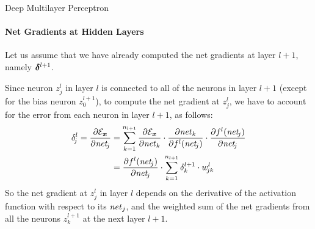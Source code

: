 \begin{frame}{Deep Multilayer Perceptron}
\framesubtitle{Net Gradients at Hidden Layers}
Let us assume that we have already computed the net gradients at layer
$l+1$, namely ${\bm \delta}^{l+1}$.

\medskip

Since neuron $z^l_{\!j}$ in layer $l$ is connected to all of the neurons in
layer $l+1$ (except for the bias neuron $z^{l+1}_0$), 
to compute the net gradient at
$z^l_{\!j}$, we
have to account for the error from each neuron in layer $l+1$, as
follows:
\begin{align*}
    \delta^l_{\!j} = \frac{\partial \cE_\bx}{\partial \net_{\!j}}
    & =
    \sum^{n_{l+1}}_{k=1} \frac{\partial \cE_\bx}{\partial \net_k} \cdot
    \frac{\partial \net_{k}}{\partial f^l(\net_{\!j})} \cdot
    \frac{\partial f^l(\net_{\!j})}{\partial \net_{\!j}}\\
& = \frac{\partial f^l(\net_{\!j})}{\partial \net_{\!j}} \cdot 
\sum^{n_{l+1}}_{k=1} \delta^{l+1}_k \cdot w^l_{\!jk}
\end{align*}
So the net gradient at $z^l_{\!j}$ in layer $l$ depends on the derivative of the 
activation function with respect to its $\mathit{net}_j$, and the 
weighted sum of the net gradients from
all the neurons $z^{l+1}_k$ at the next layer $l+1$.
\end{frame}
%
